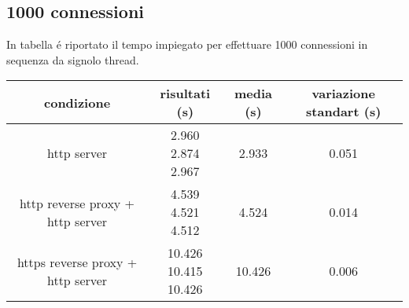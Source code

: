 \subsection{1000 connessioni}
In tabella é riportato il tempo impiegato per effettuare 1000 connessioni in sequenza da signolo thread.
\begin{center}
  \begin{tabular}{|c|c|c|c|}
    \hline
    condizione & risultati (s) & media (s) & variazione standart (s) \\
    \hline
    \hline
    http server & \makecell {2.960 \\ 2.874 \\ 2.967} & 2.933 & 0.051 \\
    \hline
    http reverse proxy + http server & \makecell {4.539 \\ 4.521 \\ 4.512} & 4.524 & 0.014 \\
    \hline
    https reverse proxy + http server & \makecell {10.426 \\ 10.415 \\ 10.426} & 10.426 & 0.006 \\
    \hline
  \end{tabular}
\end{center}

\begin{center}
\end{center}

